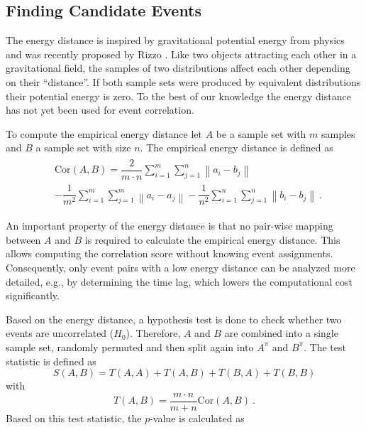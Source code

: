 \documentclass[conference]{IEEEtran}
\theoremstyle{examplestyle}
\begin{document}
\subsection{Finding Candidate Events}
\label{sec:energyDistance}
The energy distance is inspired by gravitational potential energy from physics and was recently proposed by Rizzo \cite{Rizzo2016}. Like two objects attracting each other in a gravitational field, the samples of two distributions affect each other depending on their ``distance''. If both sample sets were produced by equivalent distributions their potential energy is zero. To the best of our knowledge the energy distance has not yet been used for event correlation.

To compute the empirical energy distance let \(A\) be a sample set with \(m\) samples and \(B\) a sample set with size \(n\). The empirical energy distance is defined as
\begin{align}
\begin{split}
	& \text{Cor}(A, B) = \dfrac{2}{m \cdot n} \sum_{i = 1}^m \sum_{j = 1}^n \left\| a_i - b_j \right\| \\
	& - \dfrac{1}{m^2} \sum_{i = 1}^m \sum_{j = 1}^m \left\| a_i - a_j \right\| - \dfrac{1}{n^2} \sum_{i = 1}^n \sum_{j = 1}^n \left\| b_i - b_j \right\| ~.
\end{split}
\end{align}

An important property of the energy distance is that no pair-wise mapping between \(A\) and \(B\) is required to calculate the empirical energy distance. This allows computing the correlation score without knowing event assignments. 
Consequently, only event pairs with a low energy distance can be analyzed more detailed, e.g., by determining the time lag, which lowers the computational cost significantly.

Based on the energy distance, a hypothesis test is done to check whether two events are uncorrelated (\(H_0\)). Therefore, \(A\) and \(B\) are combined into a single sample set, randomly permuted and then split again into \(A^\pi\) and \(B^\pi\). The test statistic is defined as
\begin{equation}
	S(A, B) = T(A, A) + T(A, B) + T(B, A) + T(B, B)
\end{equation}
with
\begin{equation*}
	T(A, B) = \dfrac{m \cdot n}{m + n} \text{Cor}(A, B) ~.
\end{equation*}
Based on this test statistic, the \(p\)-value is calculated as
\end{document}
